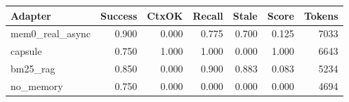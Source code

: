 \begin{tabular}{lrrrrrr}
\hline
Adapter & Success & CtxOK & Recall & Stale & Score & Tokens \\
\hline
mem0\_real\_async & 0.900 & 0.000 & 0.775 & 0.700 & 0.125 & 7033 \\
capsule & 0.750 & 1.000 & 1.000 & 0.000 & 1.000 & 6643 \\
bm25\_rag & 0.850 & 0.000 & 0.900 & 0.883 & 0.083 & 5234 \\
no\_memory & 0.750 & 0.000 & 0.000 & 0.000 & 0.000 & 4694 \\
\hline
\end{tabular}
